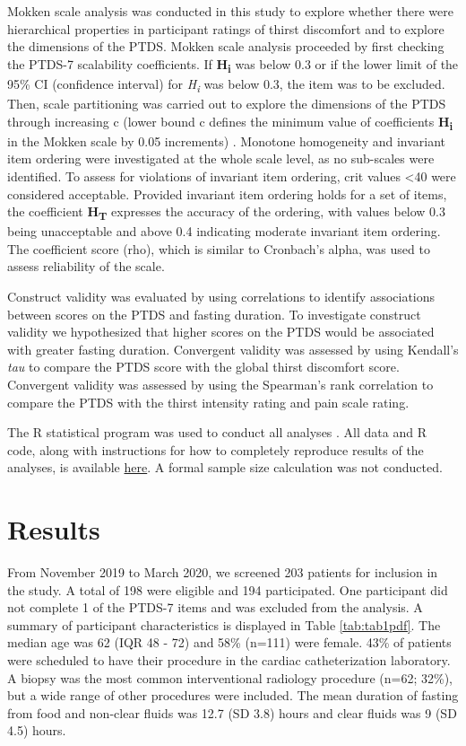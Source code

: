 \documentclass[12pt,twoside,]{pinp}
\begin{document}
Mokken scale analysis was conducted in this study to explore whether
there were hierarchical properties in participant ratings of thirst
discomfort and to explore the dimensions of the PTDS. Mokken scale
analysis proceeded by first checking the PTDS-7 scalability
coefficients. If \textbf{H\textsubscript{i}} was below 0.3 or if the
lower limit of the 95\% CI (confidence interval) for
\emph{H\textsubscript{i}} was below 0.3, the item was to be excluded.
Then, scale partitioning was carried out to explore the dimensions of
the PTDS through increasing c (lower bound c defines the minimum value
of coefficients \textbf{H\textsubscript{i}} in the Mokken scale by 0.05
increments) \citep{molenaar2000mps5}. Monotone homogeneity and invariant
item ordering were investigated at the whole scale level, as no
sub-scales were identified. To assess for violations of invariant item
ordering, crit values \textless40 were considered
acceptable.\citep{molenaar2000mps5} Provided invariant item ordering
holds for a set of items, the coefficient \textbf{H\textsubscript{T}}
expresses the accuracy of the ordering, with values below 0.3 being
unacceptable and above 0.4 indicating moderate invariant item
ordering.\citep{Ligtvoet_2010} The coefficient score (rho), which is
similar to Cronbach's alpha, was used to assess reliability of the
scale.

Construct validity was evaluated by using correlations to identify
associations between scores on the PTDS and fasting duration. To
investigate construct validity we hypothesized that higher scores on the
PTDS would be associated with greater fasting duration. Convergent
validity was assessed by using Kendall's \emph{tau} to compare the PTDS
score with the global thirst discomfort score. Convergent validity was
assessed by using the Spearman's rank correlation to compare the PTDS
with the thirst intensity rating and pain scale rating.

The R statistical program was used to conduct all analyses
\citep{rcore2020}. All data and R code, along with instructions for how
to completely reproduce results of the analyses, is available
\href{https://github.com/awconway/ptds}{here}. A formal sample size
calculation was not conducted.

\hypertarget{results}{%
\section{Results}\label{results}}

From November 2019 to March 2020, we screened 203 patients for inclusion
in the study. A total of 198 were eligible and 194 participated. One
participant did not complete 1 of the PTDS-7 items and was excluded from
the analysis. A summary of participant characteristics is displayed in
Table \ref{tab:tab1pdf}. The median age was 62 (IQR 48 - 72) and 58\%
(n=111) were female. 43\% of patients were scheduled to have their
procedure in the cardiac catheterization laboratory. A biopsy was the
most common interventional radiology procedure (n=62; 32\%), but a wide
range of other procedures were included. The mean duration of fasting
from food and non-clear fluids was 12.7 (SD 3.8) hours and clear fluids
was 9 (SD 4.5) hours.
\end{document}
